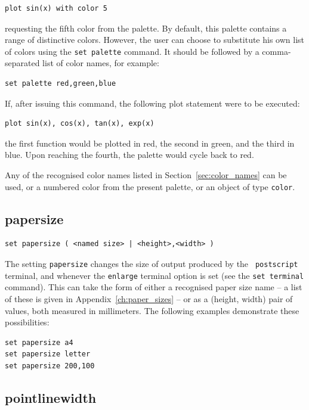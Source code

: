 \begin{verbatim}
plot sin(x) with color 5
\end{verbatim}

\noindent requesting the fifth color from the palette. By default, this palette
contains a range of distinctive colors. However, the user can choose to
substitute his own list of colors using the {\tt set palette} command. It
should be followed by a comma-separated list of color names, for example:

\begin{verbatim}
set palette red,green,blue
\end{verbatim}

\noindent If, after issuing this command, the following plot statement were to
be executed:

\begin{verbatim}
plot sin(x), cos(x), tan(x), exp(x)
\end{verbatim}

\noindent the first function would be plotted in red, the second in green, and
the third in blue. Upon reaching the fourth, the palette would cycle back to
red.

Any of the recognised color names listed in Section~\ref{sec:color_names} can
be used, or a numbered color from the present palette, or an object of type {\tt color}.


\subsection{papersize}

\begin{verbatim}
set papersize ( <named size> | <height>,<width> )
\end{verbatim}

The setting {\tt papersize} changes the size of output produced by the {\tt
postscript} terminal, and whenever the {\tt enlarge} terminal option is set
(see the {\tt set terminal} command). This can take the form of either a
recognised paper size name -- a list of these is given in
Appendix~\ref{ch:paper_sizes} -- or as a (height, width) pair of values, both
measured in millimeters. The following examples demonstrate these
possibilities:

\begin{verbatim}
set papersize a4
set papersize letter
set papersize 200,100
\end{verbatim}


\subsection{pointlinewidth}

